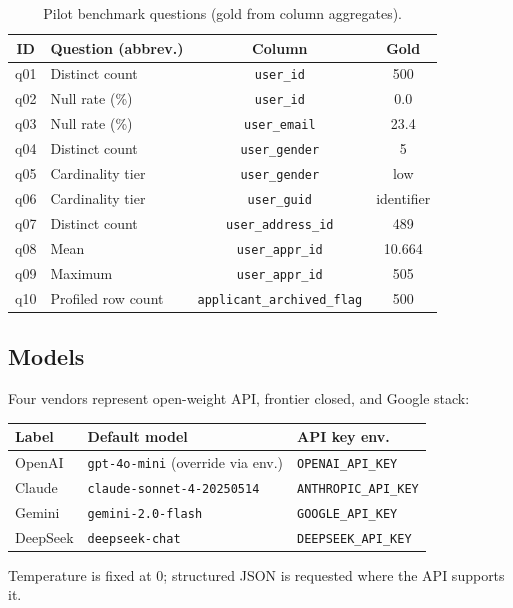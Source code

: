 \documentclass[11pt,a4paper]{article}
\begin{document}
\begin{table}[t]
  \centering
  \caption{Pilot benchmark questions (gold from column aggregates).}
  \label{tab:questions}
  \small
  \begin{tabular}{@{}clcc@{}}
    \toprule
    ID & Question (abbrev.) & Column & Gold \\
    \midrule
    q01 & Distinct count & \texttt{user\_id} & 500 \\
    q02 & Null rate (\%) & \texttt{user\_id} & 0.0 \\
    q03 & Null rate (\%) & \texttt{user\_email} & 23.4 \\
    q04 & Distinct count & \texttt{user\_gender} & 5 \\
    q05 & Cardinality tier & \texttt{user\_gender} & low \\
    q06 & Cardinality tier & \texttt{user\_guid} & identifier \\
    q07 & Distinct count & \texttt{user\_address\_id} & 489 \\
    q08 & Mean & \texttt{user\_appr\_id} & 10.664 \\
    q09 & Maximum & \texttt{user\_appr\_id} & 505 \\
    q10 & Profiled row count & \texttt{applicant\_archived\_flag} & 500 \\
    \bottomrule
  \end{tabular}
\end{table}

\subsection{Models}
\label{sec:models}
Four vendors represent open-weight API, frontier closed, and Google stack:
\begin{center}
  \small
  \begin{tabular}{@{}lll@{}}
    \toprule
    Label & Default model & API key env. \\
    \midrule
    OpenAI    & \texttt{gpt-4o-mini} (override via env.) & \texttt{OPENAI\_API\_KEY} \\
    Claude    & \texttt{claude-sonnet-4-20250514} & \texttt{ANTHROPIC\_API\_KEY} \\
    Gemini    & \texttt{gemini-2.0-flash} & \texttt{GOOGLE\_API\_KEY} \\
    DeepSeek  & \texttt{deepseek-chat} & \texttt{DEEPSEEK\_API\_KEY} \\
    \bottomrule
  \end{tabular}
\end{center}
Temperature is fixed at $0$; structured JSON is requested where the API supports it.
\end{document}
